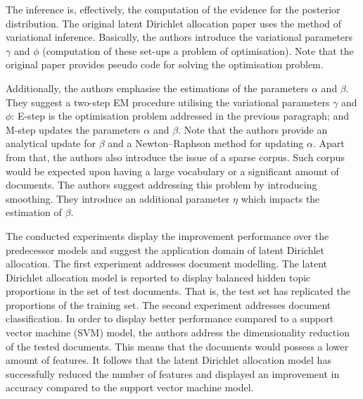 \documentclass{mprop}
\begin{document}
\par The inference is, effectively, the computation of the evidence for the posterior distribution. The original latent Dirichlet allocation paper uses the method of variational inference. Basically, the authors introduce the variational parameters $\gamma$ and $\phi$ (computation of these set-ups a problem of optimisation). Note that the original paper provides pseudo code for solving the optimisation problem.

\par Additionally, the authors emphasise the estimations of the parameters $\alpha$ and $\beta$. They suggest a two-step EM procedure utilising the variational parameters $\gamma$ and $\phi$: E-step is the optimisation problem addressed in the previous paragraph; and M-step updates the parameters $\alpha$ and $\beta$. Note that the authors provide an analytical update for $\beta$ and a Newton--Raphson method for updating $\alpha$. Apart from that, the authors also introduce the issue of a sparse corpus. Such corpus would be expected upon having a large vocabulary or a significant amount of documents. The authors suggest addressing this problem by introducing smoothing. They introduce an additional parameter $\eta$ which impacts the estimation of $\beta$. 

\par The conducted experiments display the improvement performance over the predecessor models and suggest the application domain of latent Dirichlet allocation. The first experiment addresses document modelling. The latent Dirichlet allocation model is reported to display balanced hidden topic proportions in the set of test documents. That is, the test set has replicated the proportions of the training set. The second experiment addresses document classification. In order to display better performance compared to a support vector machine (SVM) model, the authors address the dimensionality reduction of the tested documents. This means that the documents would possess a lower amount of features. It follows that the latent Dirichlet allocation model has successfully reduced the number of features and displayed an improvement in accuracy compared to the support vector machine model. 
\end{document}
